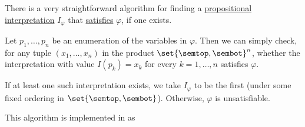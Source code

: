 \begin{algorithm}\label{alg:brute_force_propositional_satisfaction}
  There is a very straightforward algorithm for finding a \hyperref[def:propositional_interpretation]{propositional interpretation} \( I_\varphi \) that \hyperref[def:propositional_semantics/satisfaction]{satisfies} \( \varphi \), if one exists.

  Let \( p_1, \ldots, p_n \) be an enumeration of the variables in \( \varphi \). Then we can simply check, for any tuple \( (x_1, \ldots, x_n) \) in the product \( \set{ \semtop, \sembot }^n \), whether the interpretation with value \( I(p_k) = x_k \) for every \( k = 1, \ldots, n \) satisfies \( \varphi \).

  If at least one such interpretation exists, we take \( I_\varphi \) to be the first (under some fixed ordering in \( \set{ \semtop, \sembot } \)). Otherwise, \( \varphi \) is unsatisfiable.
\end{algorithm}
\begin{comments}
  \item This algorithm is implemented in \cite{notebook:code} as
  \begin{CodeRefDisplay}
  \end{CodeRefDisplay}
\end{comments}
